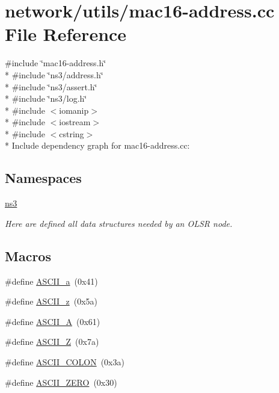 \hypertarget{mac16-address_8cc}{}\section{network/utils/mac16-\/address.cc File Reference}
\label{mac16-address_8cc}
{\ttfamily \#include \char`\"{}mac16-\/address.\+h\char`\"{}}\\*
{\ttfamily \#include \char`\"{}ns3/address.\+h\char`\"{}}\\*
{\ttfamily \#include \char`\"{}ns3/assert.\+h\char`\"{}}\\*
{\ttfamily \#include \char`\"{}ns3/log.\+h\char`\"{}}\\*
{\ttfamily \#include $<$iomanip$>$}\\*
{\ttfamily \#include $<$iostream$>$}\\*
{\ttfamily \#include $<$cstring$>$}\\*
Include dependency graph for mac16-\/address.cc\+:
\subsection*{Namespaces}
\begin{DoxyCompactItemize}
\item 
 \hyperlink{namespacens3}{ns3}
\begin{DoxyCompactList}\small\item\em Here are defined all data structures needed by an O\+L\+SR node. \end{DoxyCompactList}\end{DoxyCompactItemize}
\subsection*{Macros}
\begin{DoxyCompactItemize}
\item 
\#define \hyperlink{mac16-address_8cc_acb0c7653dabe53da8a7fb03bcad505e7}{A\+S\+C\+I\+I\+\_\+a}~(0x41)
\item 
\#define \hyperlink{mac16-address_8cc_a76cb409bf2d31112b1bec0056271e3ce}{A\+S\+C\+I\+I\+\_\+z}~(0x5a)
\item 
\#define \hyperlink{mac16-address_8cc_a6ccdee41712ed103021e82cb944f47e6}{A\+S\+C\+I\+I\+\_\+A}~(0x61)
\item 
\#define \hyperlink{mac16-address_8cc_a282e9a9765b0ae5f0a4aa813c3a4932c}{A\+S\+C\+I\+I\+\_\+Z}~(0x7a)
\item 
\#define \hyperlink{mac16-address_8cc_aa13140b716dfb153353b2bf8be77d3f5}{A\+S\+C\+I\+I\+\_\+\+C\+O\+L\+ON}~(0x3a)
\item 
\#define \hyperlink{mac16-address_8cc_abde11a6ee98560227d0d3889da0408e4}{A\+S\+C\+I\+I\+\_\+\+Z\+E\+RO}~(0x30)
\end{DoxyCompactItemize}
